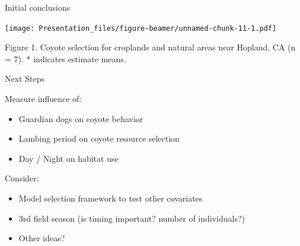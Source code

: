 \documentclass[
  ignorenonframetext,
]{beamer}
\providecommand{\tightlist}{%
  \setlength{\itemsep}{0pt}\setlength{\parskip}{0pt}}
\begin{document}
\begin{frame}{Initial conclusions}
\protect\hypertarget{initial-conclusions}{}

\texttt{[image: Presentation\_files/figure-beamer/unnamed-chunk-11-1.pdf]}

Figure 1. Coyote selection for croplands and natural areas near Hopland,
CA (n = 7). * indicates estimate means.

\end{frame}

\begin{frame}{Next Steps}
\protect\hypertarget{next-steps}{}

Measure influence of:

\begin{itemize}
\tightlist
\item
  Guardian dogs on coyote behavior
\item
  Lambing period on coyote resource selection
\item
  Day / Night on habitat use
\end{itemize}

Consider:

\begin{itemize}
\tightlist
\item
  Model selection framework to test other covariates
\item
  3rd field season (is timing important? number of individuals?)
\item
  Other ideas?
\end{itemize}

\end{frame}
\end{document}
